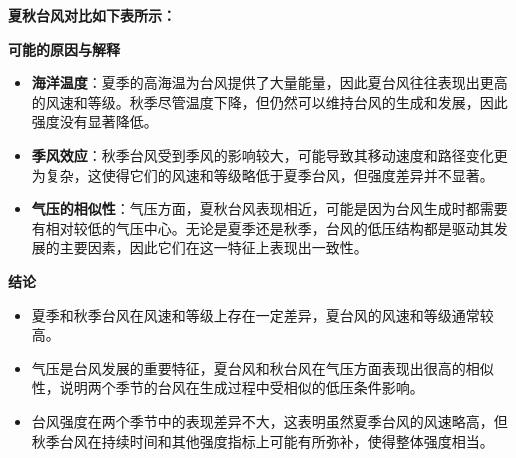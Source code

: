 \documentclass[withoutpreface,bwprint]{cumcmthesis}
\begin{document}
\newpage
\textbf{夏秋台风对比如下表所示：}

\begin{table}[h]
\centering
{}
\caption{台风特征对比}
\end{table}



\vspace{1em}
\textbf{可能的原因与解释}

\begin{itemize}
    \setlength{\itemindent}{2em}
    \item \textbf{海洋温度}：夏季的高海温为台风提供了大量能量，因此夏台风往往表现出更高的风速和等级。秋季尽管温度下降，但仍然可以维持台风的生成和发展，因此强度没有显著降低。

    \item \textbf{季风效应}：秋季台风受到季风的影响较大，可能导致其移动速度和路径变化更为复杂，这使得它们的风速和等级略低于夏季台风，但强度差异并不显著。

    \item \textbf{气压的相似性}：气压方面，夏秋台风表现相近，可能是因为台风生成时都需要有相对较低的气压中心。无论是夏季还是秋季，台风的低压结构都是驱动其发展的主要因素，因此它们在这一特征上表现出一致性。
\end{itemize}

\vspace{1em}
\textbf{结论}

\begin{itemize}
    \setlength{\itemindent}{2em}
    \item 夏季和秋季台风在风速和等级上存在一定差异，夏台风的风速和等级通常较高。

    \item 气压是台风发展的重要特征，夏台风和秋台风在气压方面表现出很高的相似性，说明两个季节的台风在生成过程中受相似的低压条件影响。

    \item 台风强度在两个季节中的表现差异不大，这表明虽然夏季台风的风速略高，但秋季台风在持续时间和其他强度指标上可能有所弥补，使得整体强度相当。
\end{itemize}
\end{document}
